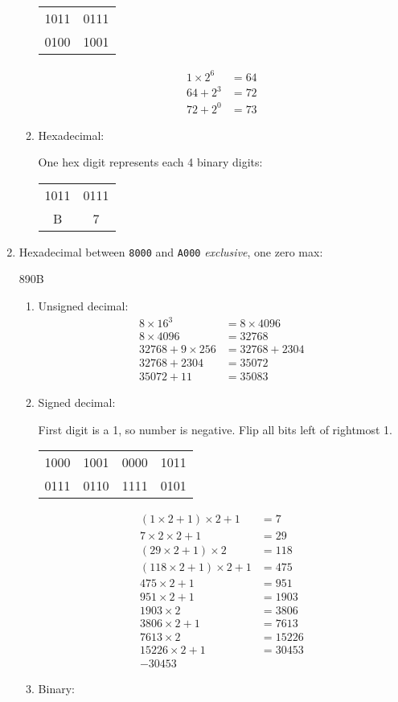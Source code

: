 \documentclass[11pt]{article}
\begin{document}
\begin{enumerate}
\begin{enumerate}
\begin{tabular}{c c}
1011 & 0111\\
0100 & 1001
\end{tabular}

\begin{align*}
1\times 2^6 &=64\\
64+2^3&=72\\
72+2^0&= \boxed{73}
\end{align*}
\item Hexadecimal:

One hex digit represents each 4 binary digits:
\begin{tabular}{c c}
1011 & 0111\\
B & 7
\end{tabular}

\end{enumerate}

\item Hexadecimal between \texttt{8000} and \texttt{A000} \emph{exclusive}, one zero max:

890B

\begin{enumerate}
\item Unsigned decimal:
\begin{align*}
8\times16^3&=8\times4096\\
8\times4096&=32768\\
32768 + 9\times256&=32768+2304\\
32768+2304&=35072\\
35072+11&=\boxed{35083}
\end{align*}
\item Signed decimal:

First digit is a 1, so number is negative. Flip all bits left of rightmost 1.

\begin{tabular}{c c c c}
1000&1001&0000&1011\\
0111&0110&1111&0101
\end{tabular}

\begin{align*}
	(1\times2+1)\times2+1&=7\\
	7\times2\times2+1&=29\\
	(29\times2+1)\times2&=118\\
	(118\times2+1)\times2+1&=475\\
	475\times2+1 &= 951\\
	951\times2+1 &= 1903\\
	1903\times2 &= 3806\\
	3806\times2+1 &= 7613\\
	7613\times2 &= 15226\\
	15226\times2+1 &= 30453\\
	\boxed{-30453}
\end{align*}
\item Binary: 


\end{enumerate}
\end{enumerate}
\end{document}
